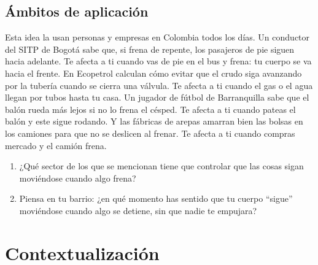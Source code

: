 \documentclass[
  spanish,
  letterpaper,
  12pt,
  oneside,
  open=any,
  DIV=15]{scrbook}
\providecommand{\tightlist}{%
  \setlength{\itemsep}{0pt}\setlength{\parskip}{0pt}}
\newcommand{\setcolorsection}[2]{%
  \definecolor{currentsectionbg}{HTML}{#1}%
  \definecolor{currentsectionborder}{HTML}{#2}%
}
\begin{document}
\subsection{Ámbitos de aplicación}\label{uxe1mbitos-de-aplicaciuxf3n-1}

Esta idea la usan personas y empresas en Colombia todos los días. Un
conductor del SITP de Bogotá sabe que, si frena de repente, los
pasajeros de pie siguen hacia adelante. Te afecta a ti cuando vas de pie
en el bus y frena: tu cuerpo se va hacia el frente. En Ecopetrol
calculan cómo evitar que el crudo siga avanzando por la tubería cuando
se cierra una válvula. Te afecta a ti cuando el gas o el agua llegan por
tubos hasta tu casa. Un jugador de fútbol de Barranquilla sabe que el
balón rueda más lejos si no lo frena el césped. Te afecta a ti cuando
pateas el balón y este sigue rodando. Y las fábricas de arepas amarran
bien las bolsas en los camiones para que no se deslicen al frenar. Te
afecta a ti cuando compras mercado y el camión frena.

\begin{tcolorbox}[enhanced jigsaw, arc=.35mm, bottomrule=.15mm, bottomtitle=1mm, breakable, colback=white, colbacktitle=quarto-callout-note-color!10!white, colframe=quarto-callout-note-color-frame, coltitle=black, left=2mm, leftrule=.75mm, opacityback=0, opacitybacktitle=0.6, rightrule=.15mm, title=\textcolor{quarto-callout-note-color}{\faInfo}\hspace{0.5em}{Conexión con el Mundo Real}, titlerule=0mm, toprule=.15mm, toptitle=1mm]

\begin{enumerate}
\def\labelenumi{\arabic{enumi}.}
\tightlist
\item
  ¿Qué sector de los que se mencionan tiene que controlar que las cosas
  sigan moviéndose cuando algo frena?
\item
  Piensa en tu barrio: ¿en qué momento has sentido que tu cuerpo
  ``sigue'' moviéndose cuando algo se detiene, sin que nadie te
  empujara?
\end{enumerate}

\end{tcolorbox}

\setcolorsection{f2c6a0}{e0b088}

\section{Contextualización}\label{contextualizaciuxf3n-1}
\end{document}
